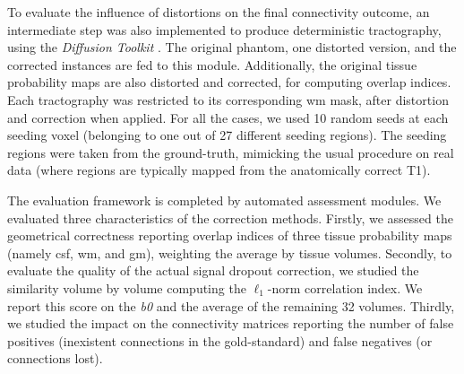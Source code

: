 To evaluate the influence of
distortions on the final connectivity outcome,
an intermediate step was also implemented to
produce deterministic tractography,
using the \emph{Diffusion Toolkit} \cite{wang_diffusion_2007}.
The original phantom, one distorted version, and
the corrected instances are fed to this module.
Additionally, the original tissue probability maps
are also distorted and corrected, for computing overlap
indices.
Each tractography was restricted to its corresponding 
\gls*{wm} mask, after distortion and correction when
applied. For all the cases, we used 10 random seeds at each seeding
voxel (belonging to one out of 27 different seeding regions).
The seeding regions were taken from the 
ground-truth, mimicking the usual procedure on real data
(where regions are typically mapped from the
anatomically correct T1).

The evaluation framework is completed by automated 
assessment modules. We evaluated three characteristics
of the correction methods. 
Firstly, we assessed the geometrical correctness
reporting overlap indices of three tissue
probability maps (namely \gls*{csf}, \gls*{wm},
and \gls*{gm}), weighting the average by tissue
volumes.
Secondly, to evaluate the quality of the actual 
signal dropout correction, we studied the 
similarity volume by volume computing the $\ell_1$-norm
correlation index. We report this score
on the \textit{b0} and the average of the remaining 32 
volumes. Thirdly, we studied the impact on the
connectivity matrices reporting the number of
false positives (inexistent connections in the
gold-standard) and false negatives (or connections
lost).